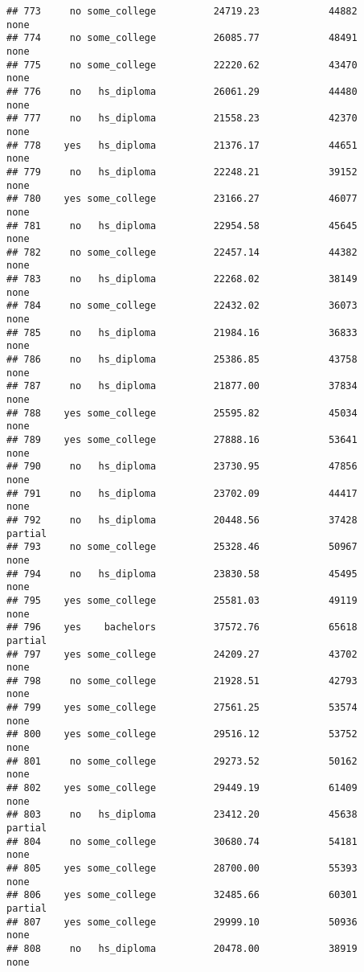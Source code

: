 \documentclass[
]{article}
\begin{document}
\begin{verbatim}
## 773     no some_college          24719.23            44882        none
## 774     no some_college          26085.77            48491        none
## 775     no some_college          22220.62            43470        none
## 776     no   hs_diploma          26061.29            44480        none
## 777     no   hs_diploma          21558.23            42370        none
## 778    yes   hs_diploma          21376.17            44651        none
## 779     no   hs_diploma          22248.21            39152        none
## 780    yes some_college          23166.27            46077        none
## 781     no   hs_diploma          22954.58            45645        none
## 782     no some_college          22457.14            44382        none
## 783     no   hs_diploma          22268.02            38149        none
## 784     no some_college          22432.02            36073        none
## 785     no   hs_diploma          21984.16            36833        none
## 786     no   hs_diploma          25386.85            43758        none
## 787     no   hs_diploma          21877.00            37834        none
## 788    yes some_college          25595.82            45034        none
## 789    yes some_college          27888.16            53641        none
## 790     no   hs_diploma          23730.95            47856        none
## 791     no   hs_diploma          23702.09            44417        none
## 792     no   hs_diploma          20448.56            37428     partial
## 793     no some_college          25328.46            50967        none
## 794     no   hs_diploma          23830.58            45495        none
## 795    yes some_college          25581.03            49119        none
## 796    yes    bachelors          37572.76            65618     partial
## 797    yes some_college          24209.27            43702        none
## 798     no some_college          21928.51            42793        none
## 799    yes some_college          27561.25            53574        none
## 800    yes some_college          29516.12            53752        none
## 801     no some_college          29273.52            50162        none
## 802    yes some_college          29449.19            61409        none
## 803     no   hs_diploma          23412.20            45638     partial
## 804     no some_college          30680.74            54181        none
## 805    yes some_college          28700.00            55393        none
## 806    yes some_college          32485.66            60301     partial
## 807    yes some_college          29999.10            50936        none
## 808     no   hs_diploma          20478.00            38919        none

\end{verbatim}
\end{document}
